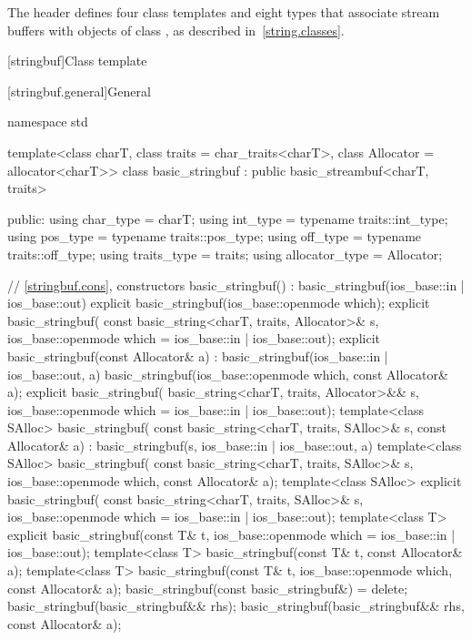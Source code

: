 \pnum
The header  defines four class templates
and eight types that associate stream buffers with objects of class
,
%
as described in~\ref{string.classes}.

[stringbuf]{Class template }

[stringbuf.general]{General}
%
\begin{codeblock}
namespace std {
  template<class charT, class traits = char_traits<charT>,
           class Allocator = allocator<charT>>
  class basic_stringbuf : public basic_streambuf<charT, traits> {
  public:
    using char_type      = charT;
    using int_type       = typename traits::int_type;
    using pos_type       = typename traits::pos_type;
    using off_type       = typename traits::off_type;
    using traits_type    = traits;
    using allocator_type = Allocator;

    // \ref{stringbuf.cons}, constructors
    basic_stringbuf() : basic_stringbuf(ios_base::in | ios_base::out) {}
    explicit basic_stringbuf(ios_base::openmode which);
    explicit basic_stringbuf(
      const basic_string<charT, traits, Allocator>& s,
      ios_base::openmode which = ios_base::in | ios_base::out);
    explicit basic_stringbuf(const Allocator& a)
      : basic_stringbuf(ios_base::in | ios_base::out, a) {}
    basic_stringbuf(ios_base::openmode which, const Allocator& a);
    explicit basic_stringbuf(
      basic_string<charT, traits, Allocator>&& s,
      ios_base::openmode which = ios_base::in | ios_base::out);
    template<class SAlloc>
      basic_stringbuf(
        const basic_string<charT, traits, SAlloc>& s, const Allocator& a)
        : basic_stringbuf(s, ios_base::in | ios_base::out, a) {}
    template<class SAlloc>
      basic_stringbuf(
        const basic_string<charT, traits, SAlloc>& s,
        ios_base::openmode which, const Allocator& a);
    template<class SAlloc>
      explicit basic_stringbuf(
        const basic_string<charT, traits, SAlloc>& s,
        ios_base::openmode which = ios_base::in | ios_base::out);
    template<class T>
      explicit basic_stringbuf(const T& t,
                               ios_base::openmode which = ios_base::in | ios_base::out);
    template<class T>
      basic_stringbuf(const T& t, const Allocator& a);
    template<class T>
      basic_stringbuf(const T& t, ios_base::openmode which, const Allocator& a);
    basic_stringbuf(const basic_stringbuf&) = delete;
    basic_stringbuf(basic_stringbuf&& rhs);
    basic_stringbuf(basic_stringbuf&& rhs, const Allocator& a);

}}
\end{codeblock}
